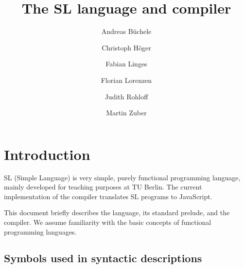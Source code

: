 \documentclass{article}
\author{Andreas Büchele \and Christoph Höger \and Fabian Linges \and
        Florian Lorenzen \and Judith Rohloff \and Martin Zuber}
\title{The SL language and compiler}
\begin{document}
\def\open{\texttt{(}}
\def\close{\texttt{)}}
\def\bropen{\texttt{\{}}
\def\brclose{\texttt{\}}}
\def\sqopen{\texttt{[}}
\def\sqclose{\texttt{]}}
\def\squote{\texttt{'}}
\def\dquote{\texttt{"}}
\def\eq{\texttt{=}}
\def\colon{\texttt{:}}
\def\lam{\mbox{\texttt{\BackslashTT}}}
\def\bar{\texttt{|}}
\def\comma{\texttt{,}}
\def\arrow{\texttt{->}}

\def\addint{\texttt{+}}
\def\subint{\texttt{-}}
\def\mulint{\texttt{*}}
\def\divint{\texttt{/}}

\def\ltint{\texttt{<}}
\def\leint{\texttt{<=}}
\def\eqint{\texttt{==}}
\def\neint{\texttt{/=}}
\def\geint{\texttt{>=}}
\def\gtint{\texttt{>}}

\def\exclamationOp{\texttt{!}}
\def\paragraphOp{\texttt{§}}
\def\percentOp{\texttt{\%}}
\def\ampOp{\texttt{\&}}
\def\questionOp{\texttt{?}}
\def\sharpOp{\texttt{\#}}
\def\pipeOp{\texttt{|}}

\maketitle


\section{Introduction}

SL (Simple Language) is very simple, purely functional programming
language, mainly developed for teaching purposes at TU Berlin. The
current implementation of the compiler translates SL programs to
JavaScript.

This document briefly describes the language, its standard prelude,
and the compiler. We assume familiarity with the basic concepts of
functional programming languages.


\subsection{Symbols used in syntactic descriptions}
\end{document}
